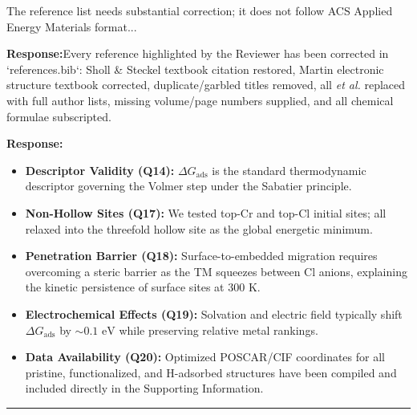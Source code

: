 \documentclass[11pt, sans, a4paper]{moderncv}
\newcommand{\response}{\vspace{0.4em}\noindent\textbf{\color{actionblue}Response:}\hspace{0.5em}}
\begin{document}
\begin{reviewercomment}
The reference list needs substantial correction; it does not follow ACS Applied Energy Materials format...
\end{reviewercomment}

\response Every reference highlighted by the Reviewer has been corrected in `references.bib`: Sholl \& Steckel textbook citation restored, Martin electronic structure textbook corrected, duplicate/garbled titles removed, all \textit{et al.} replaced with full author lists, missing volume/page numbers supplied, and all chemical formulae subscripted.

\begin{reviewercomment}
\end{reviewercomment}

\response 
\begin{itemize}[leftmargin=1.5em, itemsep=0.2em]
    \item \textbf{Descriptor Validity (Q14):} $\Delta G_{\mathrm{ads}}$ is the standard thermodynamic descriptor governing the Volmer step under the Sabatier principle.
    \item \textbf{Non-Hollow Sites (Q17):} We tested top-Cr and top-Cl initial sites; all relaxed into the threefold hollow site as the global energetic minimum.
    \item \textbf{Penetration Barrier (Q18):} Surface-to-embedded migration requires overcoming a steric barrier as the TM squeezes between Cl anions, explaining the kinetic persistence of surface sites at $300\text{ K}$.
    \item \textbf{Electrochemical Effects (Q19):} Solvation and electric field typically shift $\Delta G_{\mathrm{ads}}$ by $\sim 0.1\text{ eV}$ while preserving relative metal rankings.
    \item \textbf{Data Availability (Q20):} Optimized POSCAR/CIF coordinates for all pristine, functionalized, and H-adsorbed structures have been compiled and included directly in the Supporting Information.
\end{itemize}

\vspace{1.5em}
\noindent\rule{\textwidth}{0.6pt}
\end{document}
